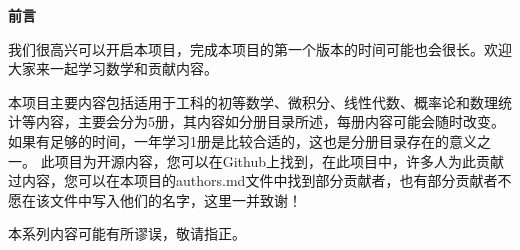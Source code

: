 \begin{center}
    \Large \textbf{前言}
\end{center}

我们很高兴可以开启本项目，完成本项目的第一个版本的时间可能也会很长。欢迎大家来一起学习数学和贡献内容。

本项目主要内容包括适用于工科的初等数学、微积分、线性代数、概率论和数理统计等内容，主要会分为5册，其内容如分册目录所述，每册内容可能会随时改变。如果有足够的时间，一年学习1册是比较合适的，这也是分册目录存在的意义之一。
此项目为开源内容，您可以在Github上找到，在此项目中，许多人为此贡献过内容，您可以在本项目的authors$.$md文件中找到部分贡献者，也有部分贡献者不愿在该文件中写入他们的名字，这里一并致谢！

本系列内容可能有所谬误，敬请指正。

